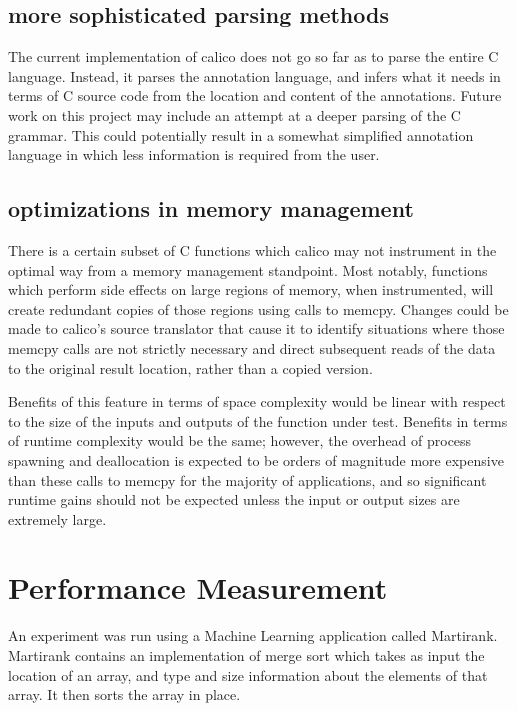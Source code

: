 \documentclass[notitlepage]{article}
\begin{document}
\subsection{more sophisticated parsing methods}

The current implementation of calico does not go so far as to parse the entire C language. Instead, it parses the annotation language, and infers what it needs in terms of C source code from the location and content of the annotations. Future work on this project may include an attempt at a deeper parsing of the C grammar. This could potentially result in a somewhat simplified annotation language in which less information is required from the user.

\subsection{optimizations in memory management}

There is a certain subset of C functions which calico may not instrument in the optimal way from a memory management standpoint. Most notably, functions which perform side effects on large regions of memory, when instrumented, will create redundant copies of those regions using calls to memcpy. Changes could be made to calico's source translator that cause it to identify situations where those memcpy calls are not strictly necessary and direct subsequent reads of the data to the original result location, rather than a copied version.

Benefits of this feature in terms of space complexity would be linear with respect to the size of the inputs and outputs of the function under test. Benefits in terms of runtime complexity would be the same; however, the overhead of process spawning and deallocation is expected to be orders of magnitude more expensive than these calls to memcpy for the majority of applications, and so significant runtime gains should not be expected unless the input or output sizes are extremely large.

\section{Performance Measurement}

An experiment was run using a Machine Learning application called Martirank. Martirank contains an implementation of merge sort which takes as input the location of an array, and type and size information about the elements of that array. It then sorts the array in place.
\end{document}
